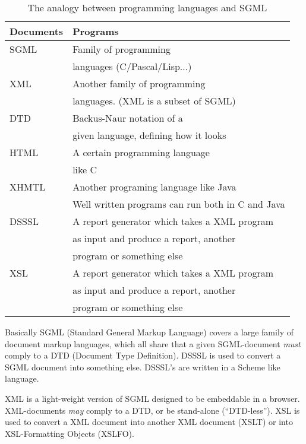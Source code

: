 \begin{table}[htbp]
  \begin{center}
    \begin{tabular}{|l|l|}
      \hline\hline
      \textbf{Documents} &  \textbf{Programs} \\
      \hline
      SGML &Family of programming \\
           & languages  (C/Pascal/Lisp...) \\
      \hline
      XML  & Another family of programming \\
           & languages. (XML is a subset of SGML) \\
      \hline
      DTD  & \textsf{Backus}-Naur notation of a \\
           & given language, defining how it looks\\
      \hline
      HTML & A certain programming language\\
           & like C \\
      \hline
      XHMTL & Another programing language like Java \\
           & Well written programs can run both in C and Java\\
      \hline
      DSSSL & A report generator which takes a XML program \\
           & as input and produce a report, another\\
           & program or something else \\
      \hline
      XSL  & A report generator which takes a XML program \\
           & as input and produce a report, another\\
           & program or something else \\
      \hline
    \end{tabular}
    \caption{The analogy between programming languages and SGML}
    \label{tab:programming-langugages-and-html}
  \end{center}
\end{table}

Basically SGML (Standard General Markup Language) covers a large
family of document markup languages, which all share that a given
SGML-document \textit{must} comply to a DTD (Document Type
Definition).  DSSSL is used to convert a SGML document into something
else.  DSSSL's are written in a Scheme like language.

XML is a light-weight version of SGML designed to be embeddable in a
browser.  XML-documents \textit{may} comply to a DTD, or be
stand-alone (``DTD-less'').  XSL is used to convert a XML document
into another XML document (XSLT) or into XSL-Formatting Objects (XSLFO).

